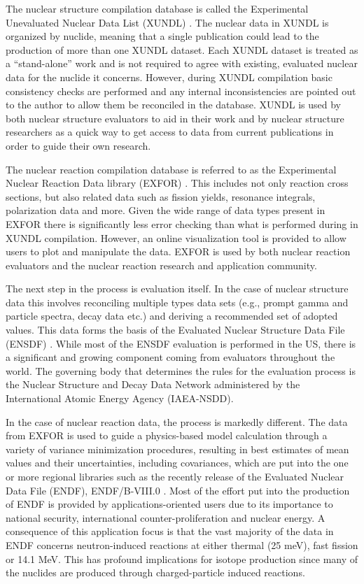 \documentclass[letterpaper]{ar-1col}
\begin{document}
The nuclear structure compilation database is called the Experimental Unevaluated Nuclear Data List (XUNDL) \cite{XUN}.
  The nuclear data in XUNDL is organized by nuclide, meaning that a single publication could lead to the production of more than one XUNDL dataset.
 Each XUNDL dataset is treated as a \enquote{stand-alone} work and is not required to agree with existing, evaluated nuclear data for the nuclide it concerns.
 However, during XUNDL compilation basic consistency checks are performed and any internal inconsistencies are pointed out to the author to allow them be reconciled in the database.
 XUNDL is used by both nuclear structure evaluators to aid in their work and by nuclear structure researchers as a quick way to get access to data from current publications in order to guide their own research.


The nuclear reaction compilation database is referred to as the Experimental Nuclear Reaction Data library (EXFOR) \cite{EXF}.
 This includes not only reaction cross sections, but also related data such as fission yields, resonance integrals, polarization data and more.
 Given the wide range of data types present in EXFOR there is significantly less error checking than what is performed during in XUNDL compilation.
 However, an online visualization tool is provided to allow users to plot and manipulate the data.
EXFOR is used by both nuclear reaction evaluators and the nuclear reaction research and application community.


The next step in the process is evaluation itself.
 In the case of nuclear structure data this involves reconciling multiple types data sets (e.g., prompt gamma and particle spectra, decay data etc.) and deriving a recommended set of adopted values.
 This data forms the basis of the Evaluated Nuclear Structure Data File (ENSDF) \cite{tepel1984ensdf}.
 While most of the ENSDF evaluation is performed in the US, there is a significant and growing component coming from evaluators throughout the world.
 The governing body that determines the rules for the evaluation process is the Nuclear Structure and Decay Data Network administered by the International Atomic Energy Agency (IAEA-NSDD).
 

In the case of nuclear reaction data, the process is markedly different.
 The data from EXFOR is used to guide a physics-based model calculation through a variety of variance minimization procedures, resulting in best estimates of mean values and their uncertainties, including covariances, which are put into the one or more regional libraries such as the recently release of the Evaluated Nuclear Data File (ENDF), ENDF/B-VIII.0 \cite{endf8_0}.
 Most of the effort put into the production of ENDF is provided by applications-oriented users due to its importance to national security, international counter-proliferation and nuclear energy.
 A consequence of this application focus is that the vast majority of the data in ENDF concerns neutron-induced reactions at either thermal (25 meV), fast fission or 14.1 MeV.
 This has profound implications for isotope production since many of the nuclides are produced through charged-particle induced reactions.
 
\end{document}
